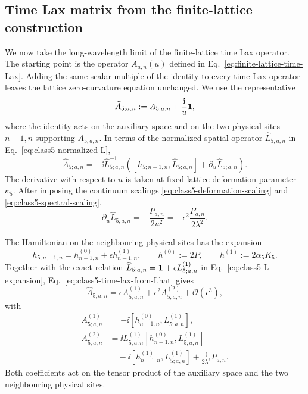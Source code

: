 \subsection{Time Lax matrix from the finite-lattice construction}
\label{sec:class5-time-lax}

We now take the long-wavelength limit of the finite-lattice time Lax
operator.  The starting point is the operator $A_{a,n}(u)$ defined in
Eq.~\eqref{eq:finite-lattice-time-Lax}.  Adding the same scalar multiple of
the identity to every time Lax operator leaves the lattice zero-curvature
equation unchanged.  We use the representative
\begin{equation}
\widehat A_{5;a,n}
:=
A_{5;a,n}+\frac{\mathrm{i}}{u}\mathbf{1},
\label{eq:class5-normalized-time-lax}
\end{equation}
where the identity acts on the auxiliary space and on the two physical sites
$n-1,n$ supporting $A_{5;a,n}$.  In terms of the normalized spatial operator
$\widehat L_{5;a,n}$ in Eq.~\eqref{eq:class5-normalized-L},
\begin{equation}
\widehat A_{5;a,n}
=
-\ii\widehat L_{5;a,n}^{-1}
\left(
[h_{5;n-1,n},\widehat L_{5;a,n}]
+\partial_u\widehat L_{5;a,n}
\right).
\label{eq:class5-time-lax-from-Lhat}
\end{equation}
The derivative with respect to $u$ is taken at fixed lattice deformation
parameter $\kappa_5$.  After imposing the continuum scalings
\eqref{eq:class5-deformation-scaling} and
\eqref{eq:class5-spectral-scaling},
\begin{equation}
\partial_u\widehat L_{5;a,n}
=-\frac{P_{a,n}}{2u^2}
=-\epsilon^2\frac{P_{a,n}}{2\lambda^2}.
\label{eq:class5-u-derivative-Lhat}
\end{equation}

The Hamiltonian on the neighbouring physical sites has the expansion
\begin{equation}
h_{5;n-1,n}
=h^{(0)}_{n-1,n}+\epsilon h^{(1)}_{n-1,n},
\qquad
h^{(0)}:=2P,
\qquad
h^{(1)}:=2\alpha_5 K_5.
\label{eq:class5-h-expansion}
\end{equation}
Together with the exact relation
$\widehat L_{5;a,n}=\mathbf{1}+\epsilon L^{(1)}_{5;a,n}$ in
Eq.~\eqref{eq:class5-L-expansion}, Eq.~\eqref{eq:class5-time-lax-from-Lhat}
gives
\begin{equation}
\widehat A_{5;a,n}
=
\epsilon A^{(1)}_{5;a,n}
+\epsilon^2 A^{(2)}_{5;a,n}
+\mathcal O(\epsilon^3),
\label{eq:class5-A-expansion}
\end{equation}
with
\begin{align}
A^{(1)}_{5;a,n}
&=-\ii[h^{(0)}_{n-1,n},L^{(1)}_{5;a,n}],
\label{eq:class5-A1}\\
A^{(2)}_{5;a,n}
&=
\ii L^{(1)}_{5;a,n}[h^{(0)}_{n-1,n},L^{(1)}_{5;a,n}]
\nonumber\\
&\quad-\ii[h^{(1)}_{n-1,n},L^{(1)}_{5;a,n}]
+\frac{\ii}{2\lambda^2}P_{a,n}.
\label{eq:class5-A2}
\end{align}
Both coefficients act on the tensor product of the auxiliary space and the
two neighbouring physical sites.

